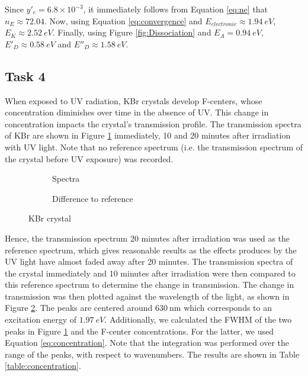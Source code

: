 \documentclass{article}
\begin{document}
Since $y'_e = 6.8 \times 10^{-3}$, it immediately follows from Equation \ref{eq:ne} that $n_E \approx 72.04$. Now, using Equation \ref{eq:convergence} and $\boxed{E_{electronic} \approx 1.94 \ eV}$, $\boxed{E_K \approx 2.52 \ eV}$. Finally, using Figure \ref{fig:Dissociation} and $E_A = 0.94 \ eV$, $\boxed{E'_D \approx 0.58 \ eV}$ and $\boxed{E''_D \approx 1.58 \ eV}$.

\pagebreak{}

\subsection{Task 4}
When exposed to UV radiation, KBr crystals develop F-centers, whose concentration diminishes over time in the absence of UV. This change in concentration impacts the crystal's transmission profile. The transmission spectra of KBr are shown in Figure \ref{transmissionKbr} immediately, 10 and 20 minutes after irradiation with UV light. Note that no reference spectrum (i.e. the transmission spectrum of the crystal before UV exposure) was recorded. 

\begin{figure}[h]
	\centering
	\begin{subfigure}{0.45\textwidth}
		\centering
		\scalebox{0.50}{}
		\caption{Spectra}
		\label{transmissionKbr}
	\end{subfigure}
	\hspace{0.5cm}
	\begin{subfigure}{0.45\textwidth}
		\centering
		\scalebox{0.50}{}
		\caption{Difference to reference}
		\label{changeInTransmission}
	\end{subfigure}
	\caption{KBr crystal}
	\label{KBr}
\end{figure}

Hence, the transmission spectrum 20 minutes after irradiation was used as the reference spectrum, which gives reasonable results as the effects produces by the UV light have almost faded away after 20 minutes. The transmission spectra of the crystal immediately and 10 minutes after irradiation were then compared to this reference spectrum to determine the change in transmission. The change in transmission was then plotted against the wavelength of the light, as shown in Figure \ref{changeInTransmission}. The peaks are centered around $\SI{630}{\nm}$ which corresponds to an excitation energy of $\SI{1.97}{eV}$. Additionally, we calculated the FWHM of the two peaks in Figure \ref{transmissionKbr} and the F-center concentrations. For the latter, we used Equation \ref{eq:concentration}. Note that the integration was performed over the range of the peaks, with respect to wavenumbers. The results are shown in Table \ref{table:concentration}.
\end{document}

